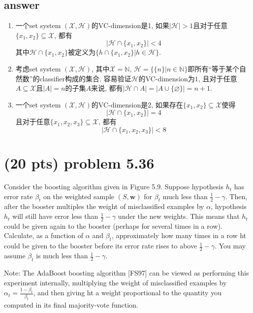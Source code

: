 \documentclass[12pt]{article}
\begin{document}
	\subsection*{answer}
	\begin{enumerate}
		\item 一个set system $(\mathcal X, \mathcal H)$的VC-dimension是1, 如果$|\mathcal H| > 1$且对于任意$\{x_1,
		x_2\} \subseteq \mathcal X$, 都有$$|\mathcal H \cap \{x_1, x_2\}| < 4$$
		其中$\mathcal H \cap \{x_1, x_2\}$被定义为$\{h \cap \{x_1, x_2\} | h \in \mathcal
		H\}$.
		\item 考虑set system $(\mathcal X, \mathcal H)$, 其中$\mathcal X = \mathbb N$, $\mathcal H = \{\{n\} | n \in \mathbb N\}$即所有“等于某个自然数”的classifier构成的集合.
		容易验证$\mathcal H$的VC-dimension为$1$, 且对于任意$A \subseteq \mathcal X$且$|A| = n$的子集$A$来说, 都有$|\mathcal H \cap A| = |A \cup \{\varnothing\}| = n + 1$.
		\item 一个set system $(\mathcal X, \mathcal H)$的VC-dimension是2, 如果存在$\{x_1, x_2\} \subseteq \mathcal X$使得$$|\mathcal H \cap \{x_1, x_2\}| = 4$$且对于任意$\{x_1,
		x_2, x_3\} \subseteq \mathcal X$, 都有$$|\mathcal H \cap \{x_1, x_2, x_3\}| < 8$$
	\end{enumerate}
	
	\section{(20 pts) problem 5.36}
	Consider the boosting algorithm given in Figure 5.9. Suppose hypothesis $h_t$
	has error rate $\beta_t$ on the weighted sample $(S,\mathbf{w})$ for $\beta_t$
	much less than $\frac12-\gamma$. Then, after the booster multiples the weight of
	misclassified examples by $\alpha$, hypothesis $h_t$ will still have error less
	than $\frac12-\gamma$ under the new weights. This means that $h_t$ could be
	given again to the booster (perhaps for several times in a row). Calculate, as a
	function of $\alpha$ and $\beta_t$, approximately how many times in a row ht
	could be given to the booster before its error rate rises to above
	$\frac12-\gamma$. You may assume $\beta_t$ is much less than $\frac12-\gamma$.
	
	Note: The AdaBoost boosting algorithm [FS97] can be viewed as performing this
	experiment internally, multiplying the weight of misclassified examples by
	$\alpha_t=\frac{1-\beta_t}{\beta_t}$, and then giving ht a weight proportional
	to the quantity you computed in its final majority-vote function.
	
\end{document}
